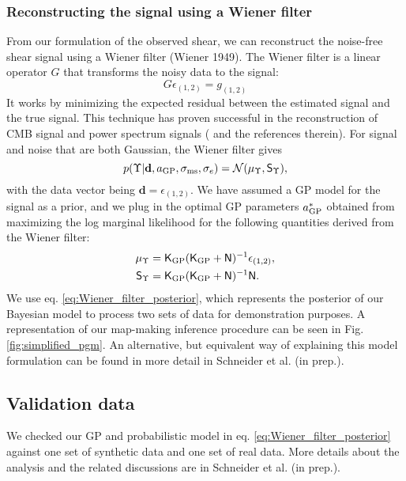 \subsubsection{Reconstructing the signal using a Wiener filter}
From our formulation of the observed shear, 
we can reconstruct the noise-free shear signal using a Wiener filter (Wiener 1949). 
The Wiener filter is a linear operator $G$ that transforms the noisy
data to the signal:
\begin{equation}
	G\epsilon_{(1, 2)} = g_{(1, 2)}
\end{equation}
It works by minimizing the expected residual between the estimated signal and the true
signal. This technique has proven successful in the reconstruction of CMB signal
and power spectrum signals (\citealt{Elsner2013} and the references therein).
For signal and noise that are both Gaussian, the Wiener filter gives 
\begin{equation}
	p(\Upsilon| \mathbf{d}, a_{\rm GP}, \sigma_{\rm ms}, \sigma_e) = \mathcal{N}(\mu_\Upsilon,
	\mathsf{S}_\Upsilon),
	\label{eq:Wiener_filter_posterior}
\end{equation}
with the data vector being $\mathbf{d} = \epsilon_{(1, 2)}$. We have assumed 
a GP model for the signal as a prior, and we plug in the
optimal GP parameters $a_{\rm GP}^*$ obtained from maximizing the log marginal
likelihood for the following quantities derived from the Wiener filter:
\begin{align}
\mu_\Upsilon & = \mathsf{K}_{\rm GP}(\mathsf{K}_{\rm GP} + \mathsf{N})^{-1}
\epsilon_{(1, 2)}, \\
\mathsf{S}_\Upsilon & = \mathsf{K}_{\rm GP}(\mathsf{K}_{\rm GP} +
\mathsf{N})^{-1}\mathsf{N}.
\end{align}
We use eq. \ref{eq:Wiener_filter_posterior}, which represents the posterior
of our Bayesian model to process two sets of
data for demonstration purposes. A representation of our map-making inference procedure can be seen in Fig. 
\ref{fig:simplified_pgm}. An alternative, but equivalent way of explaining this
model formulation can be found in more detail in Schneider et al. (in prep.).

\subsection{Validation data}
We checked our GP and probabilistic model in eq. \ref{eq:Wiener_filter_posterior}
against one set of synthetic data and one set of real data.
More details about the analysis and the related discussions are in Schneider et 
al. (in prep.).

